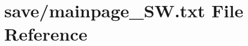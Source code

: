\hypertarget{mainpage___s_w_8txt}{}\section{save/mainpage\+\_\+\+SW.txt File Reference}
\label{mainpage___s_w_8txt}
